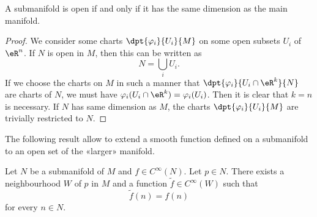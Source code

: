 \begin{proposition}\label{prop:subvar_ouvert}
	A submanifold is open if and only if it has the same dimension as the main manifold.
\end{proposition}

\begin{proof}
	We consider some charts $\dpt{\varphi_i}{U_i}{M}$ on some open subsets $U_i$ of $\eR^n$. If $N$ is open in $M$, then this can be written as
	\[
		N=\bigcup_iU_i.
	\]
	If we choose the charts on $M$ in such a manner that $\dpt{\varphi_i}{U_i\cap \eR^k}{N}$ are charts of $N$, we must have $\varphi_i(U_i\cap\eR^k)=\varphi_i(U_i)$. Then it is clear that $k=n$ is necessary.
	If $N$ has same dimension as $M$, the charts $\dpt{\varphi_i}{U_i}{M}$ are trivially restricted to $N$.
\end{proof}

The following result allow to extend a smooth function defined on a submanifold to an open set of the «larger» manifold.
\begin{proposition}     \label{PROPooOTZQooIfboXV}
	Let \( N\) be a submanifold of \( M\) and \( f\in  C^{\infty}(N)\). Let \( p\in N\). There exists a neighbourhood \( W\) of \( p\) in \( M\) and a function \( \tilde f\in  C^{\infty}(W)\) such that
	\begin{equation}
		\tilde f(n)=f(n)
	\end{equation}
	for every \( n\in N\).
\end{proposition}

